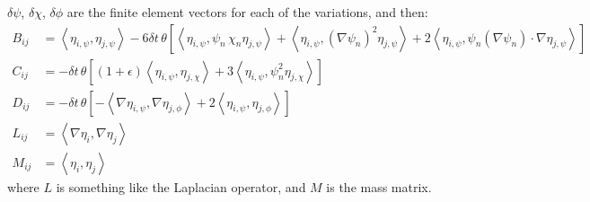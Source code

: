 \documentclass[reqno]{article}
\begin{document}
$\delta \psi$, $\delta \chi$, $\delta \phi$ are the finite element vectors for each of the variations, and then:
\begin{equation}
    \begin{split}
        B_{ij} 
        &= \left<\eta_{i,\psi}, \eta_{j, \psi}\right> 
        - 6 \delta t \, \theta \left[ \left< \eta_{i, \psi}, \psi_n \, \chi_n \eta_{j, \psi} \right>
        + \left< \eta_{i, \psi}, \left(\nabla \psi_n\right)^2 \eta_{j, \psi} \right>
        + 2 \left< \eta_{i, \psi}, \psi_n \left(\nabla \psi_n \right) \cdot \nabla \eta_{j, \psi} \right> \right] \\
        C_{ij}
        &= -\delta t \, \theta \left[ \left(1 + \epsilon\right) \left<\eta_{i, \psi}, \eta_{j, \chi}\right>
        + 3 \left< \eta_{i, \psi}, \psi_n^2 \eta_{j, \chi} \right>
        \right] \\
        D_{ij}
        &= -\delta t \, \theta \left[ -\left<\nabla \eta_{i, \psi}, \nabla \eta_{j, \phi}\right>
        + 2 \left< \eta_{i, \psi}, \eta_{j, \phi} \right> 
        \right] \\
        L_{ij}
        &= \left< \nabla \eta_{i}, \nabla \eta_{j} \right> \\
        M_{ij}
        &= \left< \eta_i, \eta_j \right>
    \end{split}
\end{equation}
where $L$ is something like the Laplacian operator, and $M$ is the mass matrix.
\end{document}
